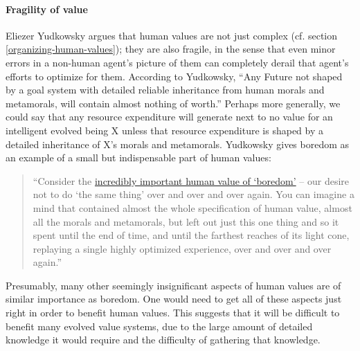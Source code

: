 \hypertarget{fragility-of-value}{\paragraph{Fragility of
value}\label{fragility-of-value}}

Eliezer Yudkowsky \citeyear{Yudkowsky2015-tz} argues that human
values are not just complex (cf. section
\ref{organizing-human-values});
they are also fragile, in the sense that even minor errors in a
non-human agent's picture of them can completely derail that agent's
efforts to optimize for them. According to Yudkowsky, ``Any Future not
shaped by a goal system with detailed reliable inheritance from human
morals and metamorals, will contain almost nothing of worth.'' Perhaps
more generally, we could say that any resource expenditure will generate
next to no value for an intelligent evolved being X unless that resource
expenditure is shaped by a detailed inheritance of X's morals and
metamorals. Yudkowsky gives boredom as an example of a small but
indispensable part of human values:

\begin{quote}
``Consider the
\href{http://lesswrong.com/lw/xr/in_praise_of_boredom/}{incredibly
important human value of `boredom'} -- our desire not to do `the same
thing' over and over and over again. You can imagine a mind that
contained almost the whole specification of human value, almost all the
morals and metamorals, but left out just this one thing and so it spent
until the end of time, and until the farthest reaches of its light cone,
replaying a single highly optimized experience, over and over and over
again.''
\end{quote}

Presumably, many other seemingly insignificant aspects of human values
are of similar importance as boredom. One would need to get all of these
aspects just right in order to benefit human values. This suggests that
it will be difficult to benefit many evolved value systems, due to the
large amount of detailed knowledge it would require and the difficulty
of gathering that knowledge.

